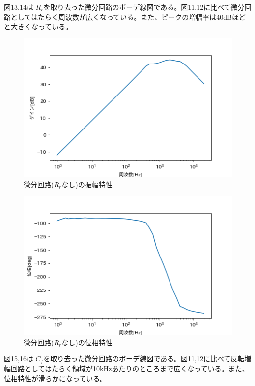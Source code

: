 \documentclass[dvipdfmx, twocolumn]{jsarticle}
\begin{document}
\begin{enumerate}
\begin{itemize}
図13,14は $R_{r}$を取り去った微分回路のボーデ線図である。図11,12に比べて微分回路としてはたらく周波数が広くなっている。また、ピークの増幅率は40dBほどと大きくなっている。
\begin{figure}[H]
\begin{center}
\includegraphics[scale = 0.5]{dGCf.png}
\caption{微分回路($R_{r}なし$)の振幅特性}
\end{center}
\end{figure}

\begin{figure}[H]
\begin{center}
\includegraphics[scale = 0.5]{dPCf.png}
\caption{微分回路($R_{r}なし$)の位相特性}
\end{center}
\end{figure}


図15,16は $C_{f}$を取り去った微分回路のボーデ線図である。図11,12に比べて反転増幅回路としてはたらく領域が10kHzあたりのところまで広くなっている。また、位相特性が滑らかになっている。


\end{itemize}
\end{enumerate}
\end{document}
